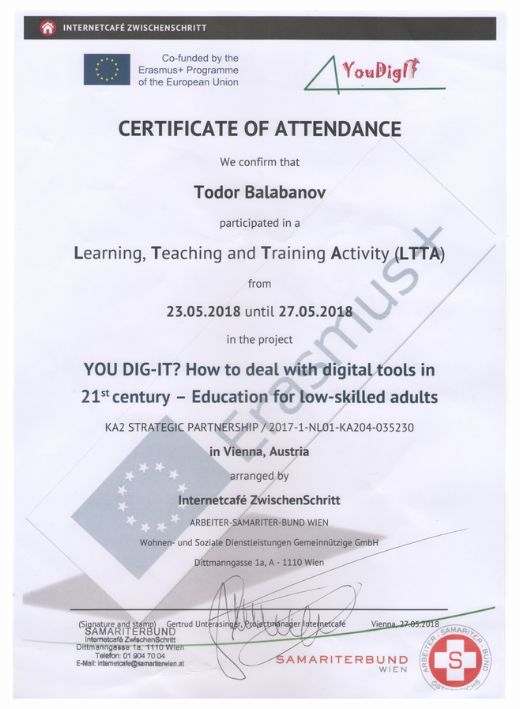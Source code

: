 \documentclass[english,a4paper]{europasscv}
\begin{document}
\includegraphics[width=\textwidth,height=\textheight,keepaspectratio]{YouDigIT2018}
\end{document}
